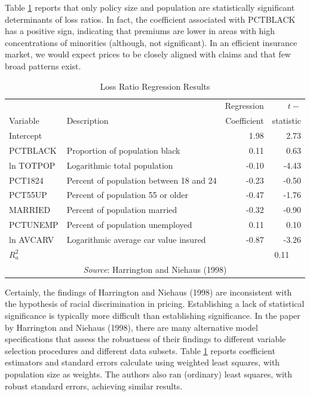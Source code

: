 Table \ref{T6:LossRatio} reports that only policy size and
population are statistically significant determinants of loss
ratios. In fact, the coefficient associated with PCTBLACK has a
positive sign, indicating that premiums are lower in areas with high
concentrations of minorities (although, not significant). In an
efficient insurance market, we would expect prices to be closely
aligned with claims and that few broad patterns exist.


\begin{table}[h]
\caption{\label{T6:LossRatio} Loss Ratio Regression Results }
\begin{tabular}{ll|rr}
   \hline
  & & Regression &   $t-$ \\
   Variable  & Description  & Coefficient &  statistic \\   \hline
Intercept & & 1.98 & 2.73 \\
PCTBLACK & Proportion of population black & 0.11 & 0.63 \\
ln TOTPOP & Logarithmic total population
& -0.10 & -4.43 \\
PCT1824 & Percent of population between 18 and 24 & -0.23 & -0.50 \\
PCT55UP & Percent of population 55 or older & -0.47 & -1.76 \\
MARRIED & Percent of population married & -0.32 & -0.90 \\
PCTUNEMP  & Percent of population unemployed& 0.11 & 0.10 \\
ln AVCARV & Logarithmic average car value insured & -0.87 & -3.26 \\
  \multicolumn{2}{l}{$R_a^2$} &  \multicolumn{2}{c}{~~~~~~~~~0.11} \\
 \hline
     \multicolumn{4}{c}{\textit{Source}: Harrington and Niehaus (1998)} \\
\end{tabular}
 \linetjed
\end{table}



Certainly, the findings of Harrington and Niehaus (1998) are
inconsistent with the hypothesis of racial discrimination in
pricing. Establishing a lack of statistical significance is
typically more difficult than establishing significance. In the
paper by Harrington and Niehaus (1998), there are many alternative
model specifications that assess the robustness of their findings to
different variable selection procedures and different data subsets.
Table \ref{T6:LossRatio} reports coefficient estimators and standard
errors calculate using weighted least squares, with population size
as weights. The authors also ran (ordinary) least squares, with
robust standard errors, achieving similar results.


